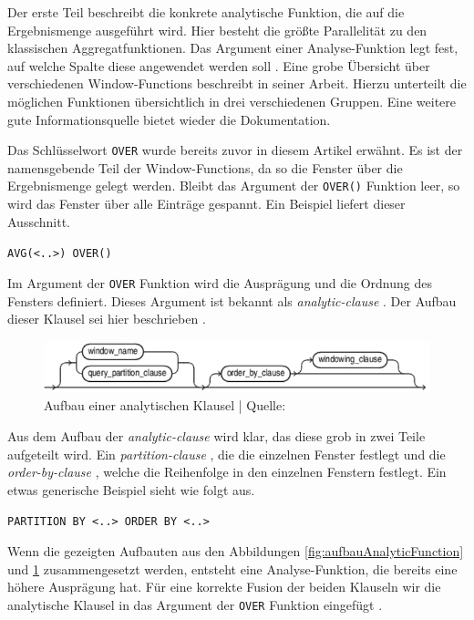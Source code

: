 Der erste Teil beschreibt die konkrete analytische Funktion, die auf die
Ergebnismenge ausgeführt wird. Hier besteht die größte Parallelität zu den klassischen
Aggregatfunktionen. Das Argument einer Analyse-Funktion legt fest, auf welche Spalte
diese angewendet werden soll \citep[S.~110]{schicker2017datenbanken}. Eine grobe
Übersicht über verschiedenen Window-Functions beschreibt \citet[]{ibrahaim23} in
seiner Arbeit. Hierzu unterteilt die möglichen Funktionen übersichtlich in drei verschiedenen
Gruppen. Eine weitere gute Informationsquelle bietet wieder die \citet{oracle} Dokumentation.

Das Schlüsselwort \texttt{OVER} wurde bereits zuvor in diesem Artikel erwähnt. Es
ist der namensgebende Teil der Window-Functions, da so die Fenster über die
Ergebnismenge gelegt werden. Bleibt das Argument der \texttt{OVER()} Funktion
leer, so wird das Fenster über alle Einträge gespannt. Ein Beispiel liefert
dieser Ausschnitt.

\texttt{AVG(<..>) OVER()} \citep{Nuijten2023}

Im Argument der \texttt{OVER} Funktion wird die Ausprägung und die Ordnung des
Fensters definiert. Dieses Argument ist bekannt als \textit{analytic-clause}
\citep{oracle}. Der Aufbau dieser Klausel sei hier beschrieben \citep{oracle}.

\begin{figure}[h]
	\centering
	\includegraphics[scale=0.5]{img/aufbauAnalyticClausel.jpg}
	\caption{ Aufbau einer analytischen Klausel | Quelle: \citep{oracle}}
	\label{fig:aufbauAnalytischeKlausel}
\end{figure}

Aus dem Aufbau der \textit{analytic-clause} \citep{oracle} wird klar, das diese grob
in zwei Teile aufgeteilt wird. Ein \textit{partition-clause} \citep{oracle}, die
die einzelnen Fenster festlegt und die \textit{order-by-clause} \citep{oracle},
welche die Reihenfolge in den einzelnen Fenstern festlegt. Ein etwas generische Beispiel
sieht wie folgt aus.

\texttt{PARTITION BY <..> ORDER BY <..>} \\ \citep[Analytic Functions]{Nuijten2023}

Wenn die gezeigten Aufbauten aus den Abbildungen \ref{fig:aufbauAnalyticFunction}
und \ref{fig:aufbauAnalytischeKlausel} zusammengesetzt werden, entsteht eine
Analyse-Funktion, die bereits eine höhere Ausprägung hat. Für eine korrekte
Fusion der beiden Klauseln wir die analytische Klausel in das Argument der
\texttt{OVER} Funktion eingefügt \citep[Analytic Functions]{Nuijten2023}.

